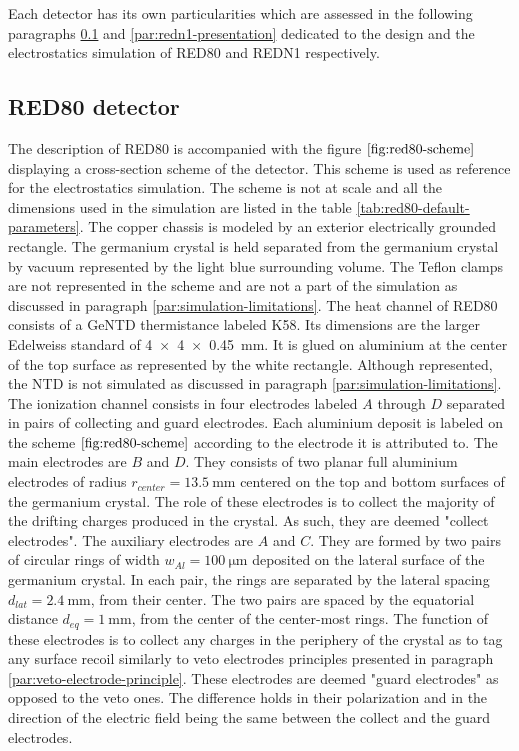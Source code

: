 Each detector has its own particularities which are assessed in the following paragraphs \ref{par:red80-presentation} and \ref{par:redn1-presentation} dedicated to the design and the electrostatics simulation of RED80 and REDN1 respectively.


\subsection{RED80 detector}
\label{par:red80-presentation}

The description of RED80 is accompanied with the figure $\ref{fig:red80-scheme}$ displaying a cross-section scheme of the detector. This scheme is used as reference for the electrostatics simulation. The scheme is not at scale and all the dimensions used in the simulation are listed in the table \ref{tab:red80-default-parameters}.
The copper chassis is modeled by an exterior electrically grounded rectangle. The germanium crystal is held separated from the germanium crystal by vacuum represented by the light blue surrounding volume.
The Teflon clamps are not represented in the scheme and are not a part of the simulation as discussed in paragraph \ref{par:simulation-limitations}.
The heat channel of RED80 consists of a GeNTD thermistance labeled K58. Its dimensions are the larger Edelweiss standard of \SI{4 x 4 x 0.45}{\mm}. It is glued on aluminium at the center of the top surface as represented by the white rectangle. Although represented, the NTD is not simulated as discussed in paragraph \ref{par:simulation-limitations}.
The ionization channel consists in four electrodes labeled $A$ through $D$ separated in pairs of collecting and guard electrodes. Each aluminium deposit is labeled on the scheme $\ref{fig:red80-scheme}$ according to the electrode it is attributed to.
The main electrodes are $B$ and $D$. They consists of two planar full aluminium electrodes of radius $r_{center} = \SI{13.5}{\mm}$ centered on the top and bottom surfaces of the germanium crystal. The role of these electrodes is to collect the majority of the drifting charges produced in the crystal. As such, they are deemed "collect electrodes".
The auxiliary electrodes are $A$ and $C$. They are formed by two pairs of circular rings of width $w_{Al}=\SI{100}{\micro\meter}$ deposited on the lateral surface of the germanium crystal. In each pair, the rings are separated by the lateral spacing $d_{lat}=\SI{2.4}{\mm}$, from their center. The two pairs are spaced by the equatorial distance $d_{eq} = \SI{1}{\mm}$, from the center of the center-most rings. The function of these electrodes is to collect any charges in the periphery of the crystal as to tag any surface recoil similarly to veto electrodes principles presented in paragraph \ref{par:veto-electrode-principle}. These electrodes are deemed "guard electrodes" as opposed to the veto ones. The difference holds in their polarization and in the direction of the electric field being the same between the collect and the guard electrodes.
